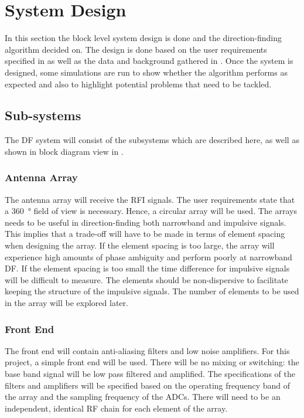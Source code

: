 \chapter{System Design}
\label{ch:system-design}
\graphicspath{{./img/system-design/}}

In this section the block level system design is done and the direction-finding algorithm decided on.
The design is done based on the user requirements specified in  as well as the data and background gathered in .
Once the system is designed, some simulations are run to show whether the algorithm performs as expected and also to highlight potential problems that need to be tackled.

\section{Sub-systems}
The DF system will consist of the subsystems which are described here, as well as shown in block diagram view in .

\subsection{Antenna Array}
The antenna array will receive the RFI signals. The user requirements state that a \SI{360}{\degree} field of view is necessary. Hence, a circular array will be used. The arrays needs to be useful in direction-finding both narrowband and impulsive signals. This implies that a trade-off will have to be made in terms of element spacing when designing the array. If the element spacing is too large, the array will experience high amounts of phase ambiguity and perform poorly at narrowband DF. If the element spacing is too small the time difference for impulsive signals will be difficult to measure. The elements should be non-dispersive to facilitate keeping the structure of the impulsive signals. The number of elements to be used in the array will be explored later.

\subsection{Front End}
The front end will contain anti-aliasing filters and low noise amplifiers. For this project, a simple front end will be used. There will be no mixing or switching: the base band signal will be low pass filtered and amplified. The specifications of the filters and amplifiers will be specified based on the operating frequency band of the array and the sampling frequency of the ADCs. There will need to be an independent, identical RF chain for each element of the array.

